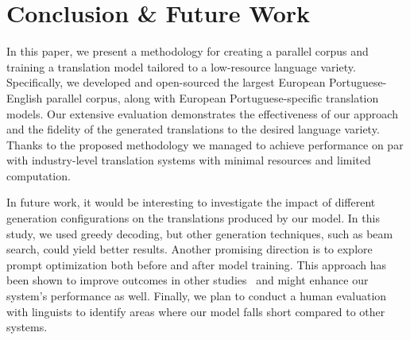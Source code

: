 \section{Conclusion \& Future Work}
\label{sec:conculsion}
In this paper, we present a methodology for creating a parallel corpus and training a translation model tailored to a low-resource language variety. Specifically, we developed and open-sourced the largest European Portuguese-English parallel corpus, along with European Portuguese-specific translation models. Our extensive evaluation demonstrates the effectiveness of our approach and the fidelity of the generated translations to the desired language variety. Thanks to the proposed methodology we managed to achieve performance on par with industry-level translation systems with minimal resources and limited computation.

In future work, it would be interesting to investigate the impact of different generation configurations on the translations produced by our model. In this study, we used greedy decoding, but other generation techniques, such as beam search, could yield better results. Another promising direction is to explore prompt optimization both before and after model training. This approach has been shown to improve outcomes in other studies~\cite{Soylu2024} and might enhance our system's performance as well. Finally, we plan to conduct a human evaluation with linguists to identify areas where our model falls short compared to other systems.
